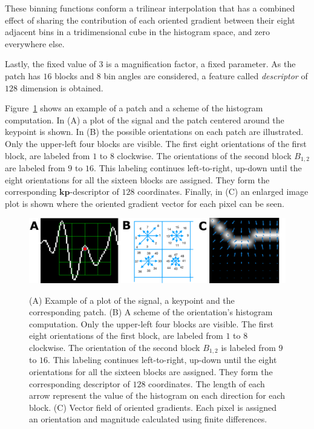 These binning functions conform a trilinear interpolation that has a combined effect of sharing the contribution of each oriented gradient between their eight adjacent bins in a tridimensional cube in the histogram space, and zero everywhere else.

Lastly, the fixed value of $ 3 $ is a magnification factor, a fixed parameter.  As the patch has  $16$ blocks and  $8$ bin angles are considered, a feature called \textit{descriptor} of $128$ dimension is obtained. 

Figure~\ref{fig:sampledescriptor} shows an example of a patch and a scheme of the histogram computation. In (A) a plot of the signal and the patch centered around the keypoint is shown. In (B) the possible orientations on each patch are illustrated.  Only the upper-left four blocks are visible.  The first eight orientations of the first block, are labeled from $1$ to $8$ clockwise. The orientations of the second block $ B_{1,2} $ are labeled from $9$ to $16$.  This labeling continues left-to-right, up-down until the eight orientations for all the sixteen blocks are assigned. They form the corresponding $\mathbf{kp}$-descriptor of $128$ coordinates. Finally, in (C) an enlarged image plot is shown where the oriented gradient vector for each pixel can be seen.

\begin{figure}[h!]
\centering
\includegraphics[width=16cm]{images/gradients.png}\label{samplegradients}
\caption[Histogram of Gradient Orientations for ERP]{ (A) Example of a plot of the signal, a keypoint and the corresponding patch. (B) A scheme of the orientation's histogram computation.  Only the upper-left four blocks are visible.  The first eight orientations of the first block, are labeled from $1$ to $8$ clockwise. The orientation of the second block $ B_{1,2} $ is labeled from $9$ to $16$.  This labeling continues left-to-right, up-down until the eight orientations for all the sixteen blocks are assigned. They form the corresponding descriptor of $128$ coordinates.  The length of each arrow represent the value of the histogram on each direction for each block. (C) Vector field of oriented gradients.  Each pixel is assigned an orientation and magnitude calculated  using finite differences. }
\label{fig:sampledescriptor}
\end{figure}

